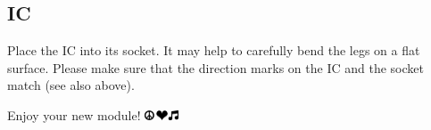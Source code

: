 \documentclass[a4paper,
               11pt,
               parskip=half,
               headinclude,
               titlepage=false]{scrartcl}
\begin{document}
\subsection*{IC}

Place the IC into its socket. It may help to carefully bend the legs on a flat surface.
Please make sure that the direction marks on the IC and the socket match (see also above).

\vspace{0.5cm}
\begin{center}
Enjoy your new module! \quad \includegraphics[height=0.8em]{peace_love_music}
\end{center}


\newpage
\end{document}
